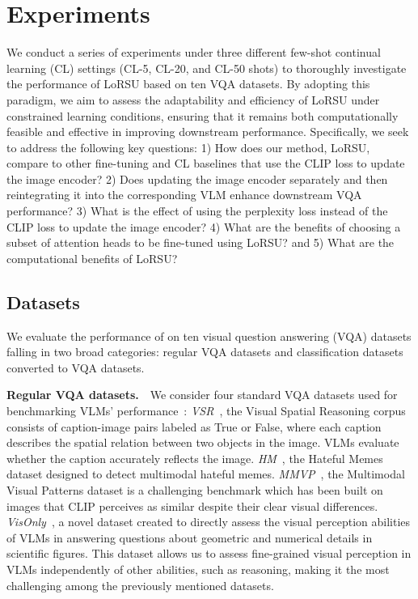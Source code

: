 \section{Experiments}\label{sec:experiments}
We conduct a series of experiments under three different few-shot continual learning (CL) settings (CL-5, CL-20, and CL-50 shots) to thoroughly investigate the performance of LoRSU based on ten VQA datasets. By adopting this paradigm, we aim to assess the adaptability and efficiency of LoRSU under constrained learning conditions, ensuring that it remains both computationally feasible and effective in improving downstream performance. Specifically, we seek to address the following key questions: 1) How does our method, LoRSU, compare to other fine-tuning and CL baselines that use the CLIP loss to update the image encoder? 2) Does updating the image encoder separately and then reintegrating it into the corresponding VLM enhance downstream VQA performance? 3) What is the effect of using the perplexity loss instead of the CLIP loss to update the image encoder? 4) What are the benefits of choosing a subset of attention heads to be fine-tuned using LoRSU? and 5) What are the computational benefits of LoRSU?

\subsection{Datasets}\label{sec:datasets}
We evaluate the performance of \ours on ten visual question answering (VQA) datasets falling in two broad categories: regular VQA datasets and classification datasets converted to VQA datasets.

\textbf{Regular VQA datasets.}~~We consider four standard VQA datasets used for benchmarking VLMs' performance~\cite{duan2024vlmevalkit}: 
\emph{VSR}~\cite{Liu2022VisualSR}, the Visual Spatial Reasoning corpus consists of caption-image pairs labeled as True or False, where each caption describes the spatial relation between two objects in the image. VLMs evaluate whether the caption accurately reflects the image.
\emph{HM}~\cite{kiela2020hateful}, the Hateful Memes dataset designed to detect multimodal hateful memes.
\emph{MMVP}~\cite{tong2024eyes}, the Multimodal Visual Patterns
dataset is a challenging benchmark which has been built on images that CLIP perceives as similar despite their clear visual differences.
\emph{VisOnly}~\cite{kamoi2024visonlyqa}, a novel dataset created to directly assess the visual perception abilities of VLMs in answering questions about geometric and numerical details in scientific figures. This dataset allows us to assess fine-grained visual perception in VLMs independently of other abilities, such as reasoning, making it the most challenging among the previously mentioned datasets.


